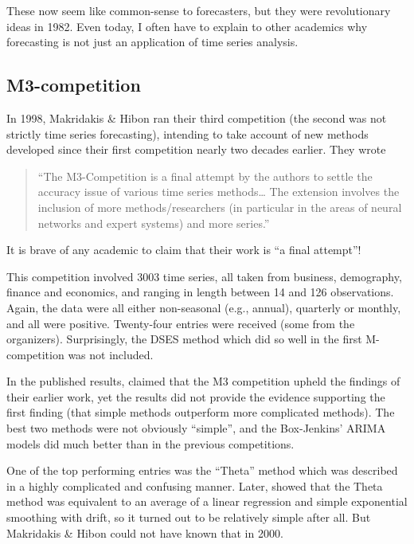 \documentclass[11pt,a4paper,]{article}
\begin{document}
These now seem like common-sense to forecasters, but they were revolutionary ideas in 1982. Even today, I often have to explain to other academics why forecasting is not just an application of time series analysis.

\hypertarget{m3-competition}{%
\subsection*{M3-competition}\label{m3-competition}}

In 1998, Makridakis \& Hibon ran their third competition (the second was not strictly time series forecasting), intending to take account of new methods developed since their first competition nearly two decades earlier. They wrote

\begin{quote}
``The M3-Competition is a final attempt by the authors to settle the accuracy issue of various time series methods\ldots{} The extension involves the inclusion of more methods/researchers (in particular in the areas of neural networks and expert systems) and more series.''
\end{quote}

It is brave of any academic to claim that their work is ``a final attempt''!

This competition involved 3003 time series, all taken from business, demography, finance and economics, and ranging in length between 14 and 126 observations. Again, the data were all either non-seasonal (e.g., annual), quarterly or monthly, and all were positive. Twenty-four entries were received (some from the organizers). Surprisingly, the DSES method which did so well in the first M-competition was not included.

In the published results, \autocite{M3} claimed that the M3 competition upheld the findings of their earlier work, yet the results did not provide the evidence supporting the first finding (that simple methods outperform more complicated methods). The best two methods were not obviously ``simple'', and the Box-Jenkins' ARIMA models did much better than in the previous competitions.

One of the top performing entries was the ``Theta'' method which was described in a highly complicated and confusing manner. Later, \textcite{HB03} showed that the Theta method was equivalent to an average of a linear regression and simple exponential smoothing with drift, so it turned out to be relatively simple after all. But Makridakis \& Hibon could not have known that in 2000.
\end{document}
